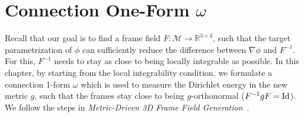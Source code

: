 \documentclass[../thesis.tex]{subfiles}
\begin{document}
\chapter{Connection One-Form $\omega$}
\label{ch:connection}

Recall that our goal is to find a frame field $F:\mathcal{M}\to \mathbb{R}^{3\times3}$,
such that the target parametrization of $\phi$ can sufficiently reduce
the difference between $\nabla \phi$ and $F^{-1}$.
For this, $F^{-1}$ needs to stay as close to being locally integrable
as possible. 
In this chapter, by starting from the local integrability condition,
we formulate a connection 1-form $\omega$ which is used to
measure the Dirichlet energy in the new metric $g$, such that
the frames stay close to being $g$-orthonormal ($F^{-1}gF= \operatorname{Id}$).
We follow the steps in \emph{Metric-Driven 3D Frame Field Generation}~\cite{Fang23}.
\end{document}
